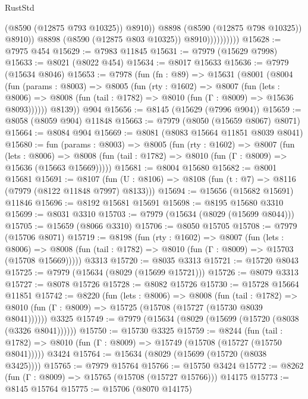 \begin{lexlean}{RustStd}
\begin{coremodule}
                                (@8590 (@12875 @793 @10325))
                                @8910))
                            @8898
                            (@8590 (@12875 @798 @10325))
                            @8910))
                        @8898
                        (@8590 (@12875 @803 @10325))
                        @8910))))))))))
@15628 := @7975 @454
@15629 := @7983 @11845
@15631 := @7979 (@15629 @7998)
@15633 := @8021 (@8022 @454)
@15634 := @8017 @15633
@15636 := @7979 (@15634 @8046)
@15653 := @7978
    (fun (fn : @89) =>
    @15631
      (@8001
        (@8004
          (fun (params : @8003) =>
          @8005
            (fun (rty : @1602) =>
            @8007
              (fun (lets : @8006) =>
              @8008 (fun (tail : @1782) => @8010 (fun (Γ : @8009) => @15636 @8093))))))
        @8139))
    @904
@15656 := @8145 (@15629 (@7996 @904))
@15659 := @8058 (@8059 @904) @11848
@15663 := @7979 (@8050 (@15659 @8067) @8071)
@15664 := @8084 @904
@15669 := @8081 (@8083 @15664 @11851 @8039 @8041)
@15680 := fun (params : @8003) =>
  @8005
    (fun (rty : @1602) =>
    @8007
      (fun (lets : @8006) =>
      @8008 (fun (tail : @1782) => @8010 (fun (Γ : @8009) => @15636 (@15663 @15669)))))
@15681 := @8004 @15680
@15682 := @8001 @15681
@15691 := @8107
    (fun (U : @8106) => @8108 (fun (t : @7) => @8116 (@7979 (@8122 @11848 @7997) @8133)))
@15694 := @15656 (@15682 @15691) @11846
@15696 := @8192 @15681 @15691
@15698 := @8195 @15680 @3310
@15699 := @8031 @3310
@15703 := @7979 (@15634 (@8029 (@15699 @8044)))
@15705 := @15659 (@8066 @3310)
@15706 := @8050 @15705
@15708 := @7979 (@15706 @8071)
@15719 := @8198
    (fun (rty : @1602) =>
    @8007
      (fun (lets : @8006) =>
      @8008 (fun (tail : @1782) => @8010 (fun (Γ : @8009) => @15703 (@15708 @15669)))))
    @3313
@15720 := @8035 @3313
@15721 := @15720 @8043
@15725 := @7979 (@15634 (@8029 (@15699 @15721)))
@15726 := @8079 @3313
@15727 := @8078 @15726
@15728 := @8082 @15726
@15730 := @15728 @15664 @11851
@15742 := @8220
    (fun (lets : @8006) =>
    @8008
      (fun (tail : @1782) =>
      @8010 (fun (Γ : @8009) => @15725 (@15708 (@15727 (@15730 @8039 @8041))))))
    @3325
@15749 := @7979 (@15634 (@8029 (@15699 (@15720 (@8038 (@3326 @8041))))))
@15750 := @15730 @3325
@15759 := @8244
    (fun (tail : @1782) => @8010 (fun (Γ : @8009) => @15749 (@15708 (@15727 (@15750 @8041)))))
    @3424
@15764 := @15634 (@8029 (@15699 (@15720 (@8038 @3425))))
@15765 := @7979 @15764
@15766 := @15750 @3424
@15772 := @8262 (fun (Γ : @8009) => @15765 (@15708 (@15727 @15766))) @14175
@15773 := @8145 @15764
@15775 := @15706 (@8070 @14175)

\end{coremodule}
\end{lexlean}
